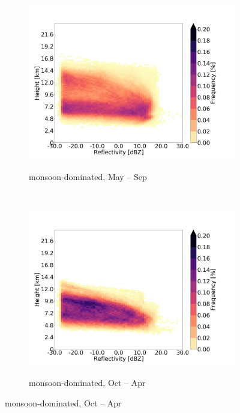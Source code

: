 \documentclass[alpha-refs]{wiley-article}
\begin{document}
\begin{figure}[!htbp]
    \begin{subfigure}[b]{0.5\textwidth}
       \centering
        \caption{monsoon-dominated, May -- Sep}
        \includegraphics[width=\textwidth]{radar_reflect_monsoondomain_monsoonseason.png}
\label{fig:CFAD3}
    \end{subfigure}%
    ~ 
    \begin{subfigure}[b]{0.5\textwidth}
        \centering
        \caption{monsoon-dominated, Oct -- Apr }        
        \includegraphics[width=\textwidth]{radar_reflect_monsoondomain_westerlyseason.png}
        \label{fig:CFAD4}
       \end{subfigure}%


\end{figure}
\end{document}
